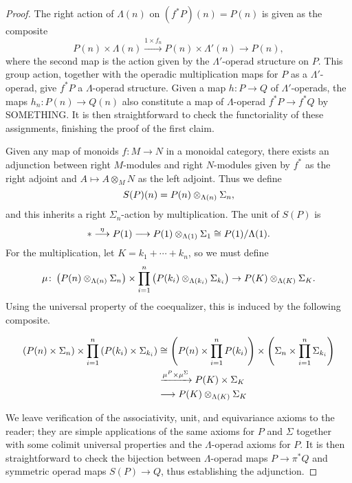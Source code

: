 \begin{proof}
The right action of $\Lambda(n)$ on $(f^{*}P)(n) = P(n)$ is given as the composite
\[
P(n) \times \Lambda(n) \stackrel{1 \times f_n}{\to} P(n) \times \Lambda'(n) \to P(n),
\]
where the second map is the action given by the $\Lambda'$-operad structure on $P$.
This group action, together with the operadic multiplication maps for $P$ as a $\Lambda'$-operad, give $f^*P$ a $\Lambda$-operad structure.
Given a map $h \colon P \to Q$ of $\Lambda'$-operads, the maps $h_n \colon P(n) \to Q(n)$ also constitute a map of $\Lambda$-operad $f^*P \to f^*Q$ by SOMETHING.
It is then straightforward to check the functoriality of these assignments, finishing the proof of the first claim.

Given any map of monoids $f \colon M \rightarrow N$ in a monoidal category, there exists an adjunction between right $M$-modules and right $N$-modules given by $f^{*}$ as the right adjoint and $A \mapsto A \otimes_{M} N$ as the left adjoint. Thus we define
  \[
    S(P)(n) = P(n) \otimes_{\Lambda(n)} \Sigma_{n},
  \]
and this inherits a right $\Sigma_{n}$-action by multiplication. The unit of $S(P)$ is
  \[
    * \stackrel{\eta}{\longrightarrow} P(1) \longrightarrow P(1) \otimes_{\Lambda(1)} \Sigma_{1} \cong P(1)/\Lambda(1).
  \]
For the multiplication, let $K = k_1 + \cdots + k_n$, so we must define
  \[
    \mu \colon \left(P(n) \otimes_{\Lambda(n)} \Sigma_{n}\right) \times \prod_{i=1}^n \left(P(k_i) \otimes_{\Lambda(k_i)} \Sigma_{k_i}\right) \rightarrow P(K) \otimes_{\Lambda(K)} \Sigma_{K}.
  \]
Using the universal property of the coequalizer, this is induced by the following composite.

  \begin{align*}
    (P(n) \times \Sigma_{n}) \times \prod_{i=1}^n \left(P(k_i) \times \Sigma_{k_i}\right) &\cong \left(P(n) \times \prod_{i=1}^n P(k_{i}) \right) \times \left(\Sigma_{n} \times \prod_{i=1}^n \Sigma_{k_{i}} \right)\\
    &\xrightarrow{\mu^P \times \mu^{\Sigma}} P(K) \times \Sigma_{K}\\
    &\longrightarrow  P(K) \otimes_{\Lambda(K)} \Sigma_{K}
  \end{align*}

We leave verification of the associativity, unit, and equivariance axioms to the reader; they are simple applications of the same axioms for $P$ and $\Sigma$ together with some colimit universal properties and the $\Lambda$-operad axioms for $P$. It is then straightforward to check the bijection between $\Lambda$-operad maps $P \rightarrow \pi^{*}Q$ and symmetric operad maps $S(P) \rightarrow Q$, thus establishing the adjunction.
\end{proof}

